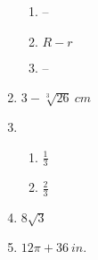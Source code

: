 \documentclass{article}
\begin{document}
\begin{enumerate}
	\begin{enumerate}
	
	\item --
	
	\item $R - r$
	
	\item --
	
	\end{enumerate}
	
\item $3 - \sqrt[3]{26} \ cm$

\item 

	\begin{enumerate}
	
	\item $\frac{1}{3}$
	
	\item $\frac{2}{3}$
	
	\end{enumerate}
	
\item $8 \sqrt{3}$

\item $12 \pi + 36 \ in.$

\end{enumerate}
\end{document}
